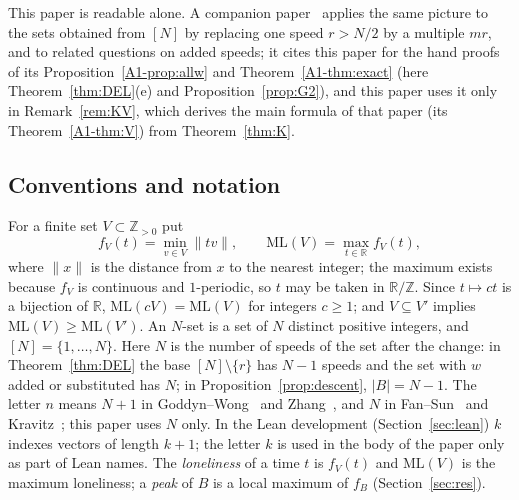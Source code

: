 \documentclass[11pt]{article}
\theoremstyle{definition}
\theoremstyle{remark}
\newcommand{\nd}[1]{\lVert #1\rVert}
\newcommand{\ML}{\mathrm{ML}}
\newcommand{\ZZ}{\mathbb{Z}}
\newcommand{\RR}{\mathbb{R}}
\newcommand{\xA}[1]{\ref{A1-#1}}
\begin{document}
This paper is readable alone. A companion paper~\cite{A1} applies the same picture to the sets obtained from $[N]$ by replacing one speed $r>N/2$ by a multiple $mr$, and to related questions on added speeds; it cites this paper for the hand proofs of its Proposition~\xA{prop:allw} and Theorem~\xA{thm:exact} (here Theorem~\ref{thm:DEL}(e) and Proposition~\ref{prop:G2}), and this paper uses it only in Remark~\ref{rem:KV}, which derives the main formula of that paper (its Theorem~\xA{thm:V}) from Theorem~\ref{thm:K}.

\subsection{Conventions and notation}
For a finite set $V\subset\ZZ_{>0}$ put
\[
f_V(t)=\min_{v\in V}\nd{tv},\qquad \ML(V)=\max_{t\in\RR}f_V(t),
\]
where $\nd{x}$ is the distance from $x$ to the nearest integer; the maximum exists because $f_V$ is continuous and $1$-periodic, so $t$ may be taken in $\RR/\ZZ$. Since $t\mapsto ct$ is a bijection of $\RR$, $\ML(cV)=\ML(V)$ for integers $c\ge1$; and $V\subseteq V'$ implies $\ML(V)\ge\ML(V')$. An $N$-set is a set of $N$ distinct positive integers, and $[N]=\{1,\dots,N\}$. Here $N$ is the number of speeds of the set after the change: in Theorem~\ref{thm:DEL} the base $[N]\setminus\{r\}$ has $N-1$ speeds and the set with $w$ added or substituted has $N$; in Proposition~\ref{prop:descent}, $|B|=N-1$. The letter $n$ means $N+1$ in Goddyn--Wong~\cite{GW} and Zhang~\cite{Z}, and $N$ in Fan--Sun~\cite{FS} and Kravitz~\cite{K}; this paper uses $N$ only. In the Lean development (Section~\ref{sec:lean}) $k$ indexes vectors of length $k+1$; the letter $k$ is used in the body of the paper only as part of Lean names. The \emph{loneliness} of a time $t$ is $f_V(t)$ and $\ML(V)$ is the maximum loneliness; a \emph{peak} of $B$ is a local maximum of $f_B$ (Section~\ref{sec:res}).
\end{document}
